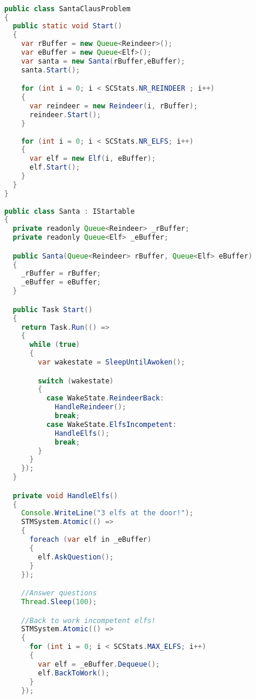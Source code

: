 \begin{lstlisting}[label=lst:impl_santa_lib,
  caption={STM Library Based Santa Claus Implementation},
  language=Java,  
  showspaces=false,
  showtabs=false,
  breaklines=true,
  showstringspaces=false,
  breakatwhitespace=true,
  commentstyle=\color{greencomments},
  keywordstyle=\color{bluekeywords},
  stringstyle=\color{redstrings},
  escapechar=~,
  morekeywords={atomic, retry, orelse, var, get, set, ref, out, readonly, virtual, override, region, endregion, foreach, lock}]  % Start your code-block

  public class SantaClausProblem
  {
    public static void Start()
    {
      var rBuffer = new Queue<Reindeer>();
      var eBuffer = new Queue<Elf>();
      var santa = new Santa(rBuffer,eBuffer);
      santa.Start();

      for (int i = 0; i < SCStats.NR_REINDEER ; i++)
      {
        var reindeer = new Reindeer(i, rBuffer);
        reindeer.Start();
      }
      
      for (int i = 0; i < SCStats.NR_ELFS; i++)
      {
        var elf = new Elf(i, eBuffer);
        elf.Start();
      }
    }
  }
  
  public class Santa : IStartable
  {
    private readonly Queue<Reindeer> _rBuffer;
    private readonly Queue<Elf> _eBuffer;

    public Santa(Queue<Reindeer> rBuffer, Queue<Elf> eBuffer)
    {
      _rBuffer = rBuffer;
      _eBuffer = eBuffer;
    }

    public Task Start()
    {
      return Task.Run(() =>
      {
        while (true)
        {
          var wakestate = SleepUntilAwoken();

          switch (wakestate)
          {
            case WakeState.ReindeerBack:
              HandleReindeer();
              break;
            case WakeState.ElfsIncompetent:
              HandleElfs();
              break;
          }
        }
      });
    }

    private void HandleElfs()
    {
      Console.WriteLine("3 elfs at the door!");
      STMSystem.Atomic(() =>
      {
        foreach (var elf in _eBuffer)
        {
          elf.AskQuestion();
        }
      });

      //Answer questions
      Thread.Sleep(100);

      //Back to work incompetent elfs!
      STMSystem.Atomic(() =>
      {
        for (int i = 0; i < SCStats.MAX_ELFS; i++)
        {
          var elf = _eBuffer.Dequeue();
          elf.BackToWork();
        }
      });


\end{lstlisting}
